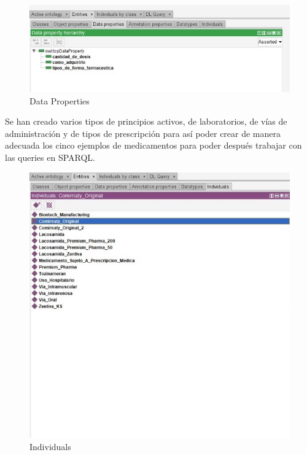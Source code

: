 \documentclass[../main.tex]{subfiles}
\begin{document}
\begin{figure}[h]
    \centering
    \includegraphics[scale=0.7]{images/protege-DataProperties.jpeg}
    \caption{Data Properties}
    \label{fig:mesh1}
\end{figure}

\vspace{2cm}
Se han creado varios tipos de principios activos, de laboratorios, de vías de administración y de tipos de prescripción para así poder crear de manera adecuada los cinco ejemplos de medicamentos para poder después trabajar con las queries en SPARQL.\\

\begin{figure}[h]
    \centering
    \includegraphics[scale=0.7]{images/protege-Individuals-pt1.jpeg}
    \caption{Individuals}
    \label{fig:mesh1}
\end{figure}
\end{document}
